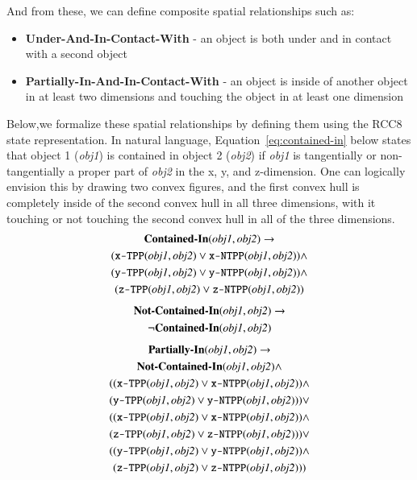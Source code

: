 \documentclass[preprint,12pt]{elsarticle}
\newcommand{\obj}[1] {\textit{#1}}
\newcommand{\sr}[1] {\textbf{#1}}
\begin{document}
And from these, we can define composite spatial relationships such as:
\begin{itemize}
  \item \sr{Under-And-In-Contact-With} - an object is both under and in contact with a second object
  \item \sr{Partially-In-And-In-Contact-With} - an object is inside of another object in at least two dimensions and touching the object in at least one dimension
\end{itemize}
Below,we formalize these spatial relationships by defining them using the RCC8 state representation. In natural language, Equation~\ref{eq:contained-in} below states that object 1 (\obj{obj1}) is contained in object 2 (\obj{obj2}) if \obj{obj1} is tangentially or non-tangentially a proper part of \obj{obj2} in the x, y, and z-dimension. One can logically envision this by drawing two convex figures, and the first convex hull is completely inside of the second convex hull in all three dimensions, with it touching or not touching the second convex hull in all of the three dimensions.
\begin{gather}
\label{eq:contained-in}
\textbf{Contained-In}(\textit{obj1}, \textit{obj2}) \rightarrow  \\
(\texttt{x-TPP}(\textit{obj1}, \textit{obj2}) \vee \texttt{x-NTPP}(\textit{obj1}, \textit{obj2})) \wedge \notag\\
(\texttt{y-TPP}(\textit{obj1}, \textit{obj2}) \vee \texttt{y-NTPP}(\textit{obj1}, \textit{obj2})) \wedge \notag\\
(\texttt{z-TPP}(\textit{obj1}, \textit{obj2}) \vee \texttt{z-NTPP}(\textit{obj1}, \textit{obj2}))\notag
\end{gather}
\begin{gather}
\label{eq:not-contained-in}
\textbf{Not-Contained-In}(\textit{obj1}, \textit{obj2}) \rightarrow\\
\neg \textbf{Contained-In}(\textit{obj1}, \textit{obj2}) \notag
\end{gather}
\begin{gather}
\label{eq:partially-in}
\textbf{Partially-In}(\textit{obj1}, \textit{obj2}) \rightarrow \\
\textbf{Not-Contained-In}(\textit{obj1}, \textit{obj2}) \wedge \notag\\
((\texttt{x-TPP}(\textit{obj1}, \textit{obj2}) \vee \texttt{x-NTPP}(\textit{obj1}, \textit{obj2})) \wedge  \notag\\
(\texttt{y-TPP}(\textit{obj1}, \textit{obj2}) \vee \texttt{y-NTPP}(\textit{obj1}, \textit{obj2}))) \vee  \notag\\
((\texttt{x-TPP}(\textit{obj1}, \textit{obj2}) \vee \texttt{x-NTPP}(\textit{obj1}, \textit{obj2})) \wedge  \notag\\
(\texttt{z-TPP}(\textit{obj1}, \textit{obj2}) \vee \texttt{z-NTPP}(\textit{obj1}, \textit{obj2}))) \vee  \notag\\
((\texttt{y-TPP}(\textit{obj1}, \textit{obj2}) \vee \texttt{y-NTPP}(\textit{obj1}, \textit{obj2})) \wedge  \notag\\
(\texttt{z-TPP}(\textit{obj1}, \textit{obj2}) \vee \texttt{z-NTPP}(\textit{obj1}, \textit{obj2}))) \notag
\end{gather}
\end{document}

